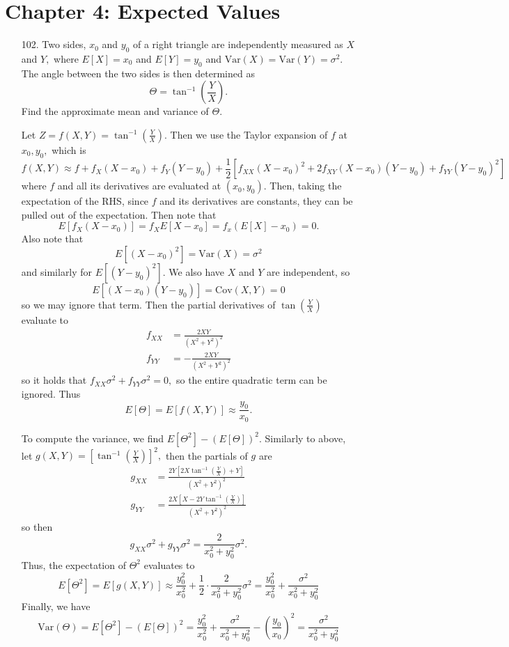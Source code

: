 \documentclass{article}
\newcommand{\var}{\mathrm{Var}}
\newcommand{\cov}{\mathrm{Cov}}
\begin{document}
\section*{Chapter 4: Expected Values}
\begin{itemize}
	\item[102.] Two sides, $x_0$ and $y_0$ of a right triangle are independently measured as $X$ and $Y,$ where $E[X]=x_0$ and $E[Y]=y_0$ and $\var(X)=\var(Y)=\sigma^2.$ The angle between the two sides is then determined as \[\Theta = \tan^{-1}\left( \frac{Y}{X} \right).\] Find the approximate mean and variance of $\Theta.$
		\begin{soln}
			Let $Z=f(X, Y)= \tan^{-1}\left(\frac{Y}{X}\right).$ Then we use the Taylor expansion of $f$ at $x_0, y_0,$ which is \[f(X, Y) \approx f + f_X(X-x_0) + f_Y (Y-y_0) + \frac{1}{2}\left[ f_{XX}(X-x_0)^2 + 2f_{XY}(X-x_0)(Y-y_0) + f_{YY}(Y-y_0)^2 \right] \] where $f$ and all its derivatives are evaluated at $(x_0, y_0).$ Then, taking the expectation of the RHS, since $f$ and its derivatives are constants, they can be pulled out of the expectation. Then note that \[E[f_X(X-x_0)]=f_X E[X-x_0]=f_x(E[X]-x_0)=0.\] Also note that \[E[(X-x_0)^2]=\var(X)=\sigma^2\] and similarly for $E[(Y-y_0)^2].$ We also have $X$ and $Y$ are independent, so \[ E[(X-x_0)(Y-y_0)]=\cov(X, Y)=0 \] so we may ignore that term. Then the partial derivatives of $\tan \left( \frac{Y}{X} \right)$ evaluate to
			\begin{align*}
				f_{XX} &= \frac{2XY}{(X^2+Y^2)^2} \\
				f_{YY} &= -\frac{2XY}{(X^2+Y^2)^2}
			\end{align*}
			so it holds that $f_{XX}\sigma^2+f_{YY}\sigma^2=0,$ so the entire quadratic term can be ignored. Thus \[E[\Theta]=E[f(X, Y)] \approx \boxed{\frac{y_0}{x_0}.}\]

			To compute the variance, we find $E[\Theta^2]-(E[\Theta])^2.$ Similarly to above, let $g(X, Y)=\left[ \tan^{-1}\left( \frac{Y}{X} \right) \right]^2,$ then the partials of $g$ are 
			\begin{align*}
				g_{XX} &= \frac{2Y\left[ 2X\tan^{-1}\left( \frac{Y}{X} \right) + Y \right]}{(X^2+Y^2)^2} \\
				g_{YY} &= \frac{2X\left[ X-2Y\tan^{-1}\left( \frac{Y}{X} \right) \right]}{(X^2+Y^2)^2}
			\end{align*} 
			so then \[g_{XX}\sigma^2+g_{YY}\sigma^2 = \frac{2}{x_0^2+y_0^2}\sigma^2.\] Thus, the expectation of $\Theta^2$ evaluates to \[E[\Theta^2] = E[g(X, Y)] \approx \frac{y_0^2}{x_0^2}+\frac{1}{2}\cdot \frac{2}{x_0^2+y_0^2}\sigma^2 = \frac{y_0^2}{x_0^2} + \frac{\sigma^2}{x_0^2+y_0^2} \] Finally, we have
			\[\var(\Theta) = E[\Theta^2]-(E[\Theta])^2 = \frac{y_0^2}{x_0^2}+\frac{\sigma^2}{x_0^2+y_0^2}-\left( \frac{y_0}{x_0} \right)^2 = \boxed{\frac{\sigma^2}{x_0^2+y_0^2}} \]
			
		\end{soln}

\end{itemize}
\end{document}

